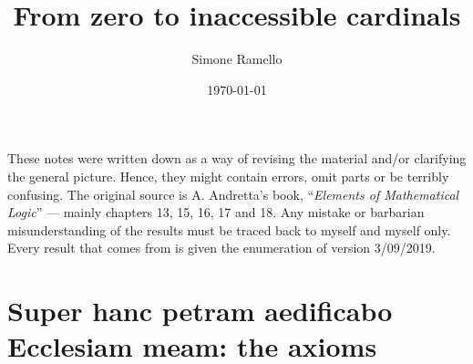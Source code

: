 \documentclass[twoside,openright,titlepage,numbers=noenddot,%
               headinclude,footinclude,cleardoublepage=empty,abstract=on,
               BCOR=23mm,paper=letter,fontsize=11pt
               ]{scrreprt}
\title{From zero to inaccessible cardinals}
\author{Simone Ramello}
\date{\today}
\begin{document}
\maketitle
    \vfill
    \noindent These notes were written down as a way of revising the material and/or clarifying the general picture. Hence, they might contain errors, omit parts or be terribly confusing. The original source is A. Andretta's book, ``\textit{Elements of Mathematical Logic}'' \cite{andretta} --- mainly chapters 13, 15, 16, 17 and 18. Any mistake or barbarian misunderstanding of the results must be traced back to myself and myself only. Every result that comes from \cite{andretta} is given the enumeration of version 3/09/2019.
\tableofcontents
\chapter[Axioms]{Super hanc petram aedificabo Ecclesiam meam: the axioms}
\end{document}
